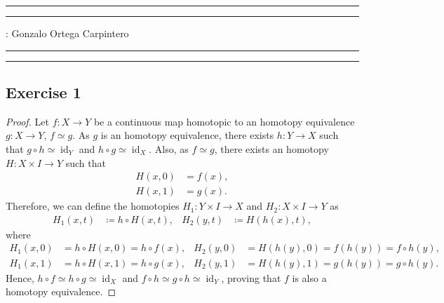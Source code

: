 \documentclass[11pt,a4paper]{article}
\newcommand{\id}{\operatorname{id}}
\begin{document}
\hrule\hrule
\vspace{1mm}


\vspace{1mm}

 : Gonzalo Ortega Carpintero
\vspace{2mm}

\hrule\hrule

\subsection*{Exercise 1}
  \begin{proof}
    Let $ f \colon X \to Y $ be a continuous map homotopic to an homotopy equivalence $ g \colon X \to Y $, $ f \simeq g $. As $ g $ is an homotopy equivalence, there exists $ h \colon Y \to X $ such that $ g \circ h \simeq \id_Y $ and $ h \circ g \simeq \id_X $. Also, as $ f \simeq g $, there exists an homotopy $ H \colon X \times I \to Y$ such that
    \begin{align*}
      H(x, 0) &= f(x), \\
      H(x, 1) &= g(x).
    \end{align*}
    Therefore, we can define the homotopies $H_1 \colon Y \times I \to X $ and $H_2 \colon X \times I \to Y $ as
    \begin{align*}
      H_1(x, t) &\coloneqq h \circ H(x, t),  &  H_2(y, t) &\coloneqq H(h(x), t),
    \end{align*}
    where
    \begin{align*}
      H_1(x, 0) &= h \circ H(x, 0) = h \circ f(x),  &  H_2(y, 0) &= H(h(y), 0) = f(h(y)) = f \circ h (y), \\
      H_1(x, 1) &= h \circ H(x, 1) = h \circ g(x),  &  H_2(y, 1) &= H(h(y), 1) = g(h(y)) = g \circ h (y).
    \end{align*}
    Hence, $ h \circ f \simeq h \circ g \simeq \id_X $ and $ f \circ h \simeq g \circ h \simeq \id_Y $, proving that $ f $ is also a homotopy equivalence.
  \end{proof}
\end{document}
